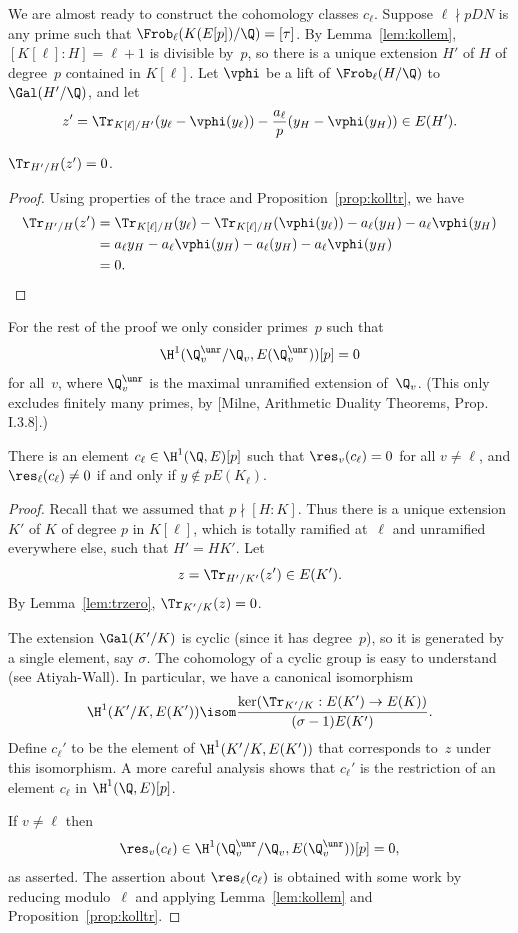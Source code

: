 \documentclass{report}
\begin{document}
We are almost ready to construct the cohomology classes $c_\ell$.
Suppose $\ell\nmid pDN$ is any prime such that
$\Frob_{\ell}(K(E[p])/\Q)=[\tau]$.  By Lemma~\ref{lem:kollem},
$[K[\ell]:H]=\ell+1$ is divisible by~$p$,
so there is a unique extension $H'$ of $H$ of degree~$p$ contained
in $K[\ell]$.  Let $\vphi$ be a lift of $\Frob_\ell(H/\Q)$ to $\Gal(H'/\Q)$,
and let
$$
  z' = \Tr_{K[\ell]/H'}(y_\ell - \vphi(y_\ell))
        - \frac{a_\ell}{p} (y_H - \vphi(y_H)) \in E(H').
$$

\begin{lemma}\label{lem:trzero}
$\Tr_{H'/H}(z') = 0$.
\end{lemma}
\begin{proof}
Using properties of the trace and Proposition~\ref{prop:kolltr},
we have
\begin{align*}
\Tr_{H'/H}(z') &= \Tr_{K[\ell]/H}(y_\ell) - \Tr_{K[\ell]/H}(\vphi(y_\ell))
      - a_\ell(y_H) - a_\ell\vphi(y_H)\\
   &= a_\ell y_H - a_\ell\vphi(y_H)
    - a_\ell(y_H) - a_\ell\vphi(y_H) \\
   &= 0.
\end{align*}
\end{proof}

For the rest of the proof we only consider primes~$p$ such that
$$
\H^1(\Q_v^{\unr}/\Q_v,E(\Q_v^{\unr}))[p] = 0
$$
for all~$v$, where $\Q_v^{\unr}$ is the maximal unramified
extension of~$\Q_v$. (This only excludes finitely many primes, by
[Milne, Arithmetic Duality Theorems, Prop. I.3.8].)
\begin{proposition}\label{prop:cl}
There is an element $c_\ell\in\H^1(\Q,E)[p]$ such that
$\res_v(c_\ell)=0$ for all $v\neq \ell$, and
$\res_\ell(c_\ell)\neq 0$ if and only if
$y\not\in p E(K_\ell)$.
\end{proposition}
\begin{proof}
Recall that we assumed that $p\nmid [H:K]$.  Thus there is a unique extension
$K'$ of $K$ of degree $p$ in $K[\ell]$, which is totally ramified at~$\ell$
and unramified everywhere else, such that $H'=HK'$.
Let
$$
  z = \Tr_{H'/K'}(z') \in E(K').
$$
By Lemma~\ref{lem:trzero}, $\Tr_{K'/K}(z) = 0$.

The extension $\Gal(K'/K)$ is cyclic (since it has degree~$p$), so it
is generated by a single element, say $\sigma$.  The cohomology of
a cyclic group is easy to understand (see Atiyah-Wall).
In particular, we have a canonical isomorphism
$$
  \H^1(K'/K, E(K')) \isom \frac{\ker(\Tr_{K'/K}: E(K') \to E(K))}{(\sigma-1)E(K')}.
$$
Define $c_\ell'$ to be the element of $\H^1(K'/K,E(K'))$
that corresponds to~$z$ under this isomorphism.
A more careful analysis shows that $c_\ell'$ is the restriction of an element
$c_\ell$ in $\H^1(\Q,E)[p]$.

If $v\neq \ell$ then
$$
\res_v(c_\ell) \in \H^1(\Q_v^{\unr}/\Q_v,E(\Q_v^{\unr}))[p] = 0,
$$
as asserted.  The assertion about $\res_\ell(c_\ell)$ is obtained
with some work by reducing modulo~$\ell$ and applying
Lemma~\ref{lem:kollem} and Proposition~\ref{prop:kolltr}.
\end{proof}
\end{document}
